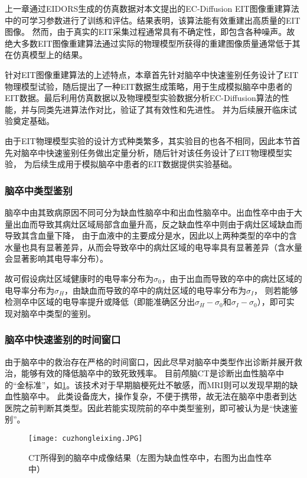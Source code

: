 

上一章通过EIDORS生成的仿真数据对本文提出的EC-Diffusion EIT图像重建算法中的可学习参数进行了训练和评估。结果表明，该算法能有效重建出高质量的EIT图像。
然而，由于真实的EIT采集过程通常具有不确定性，即包含各种噪声。故绝大多数EIT图像重建算法通过实际的物理模型所获得的重建图像质量通常低于其在仿真模型上的结果。

针对EIT图像重建算法的上述特点，本章首先针对脑卒中快速鉴别任务设计了EIT物理模型试验，随后提出了一种EIT数据生成策略，用于生成模拟脑卒中患者的EIT数据。最后利用仿真数据以及物理模型实验数据分析EC-Diffusion算法的性能，并与同类先进算法作对比，验证了其有效性和先进性。
并为后续展开临床试验奠定基础。

由于EIT物理模型实验的设计方式种类繁多，其实验目的也各不相同，因此本节首先对脑卒中快速鉴别任务做出定量分析，随后针对该任务设计了EIT物理模型实验，
为后续生成用于模拟脑卒中患者的EIT数据提供实验基础。


\subsubsection{脑卒中类型鉴别}
脑卒中由其致病原因不同可分为缺血性脑卒中和出血性脑卒中。出血性卒中由于大量出血而导致其病灶区域局部含血量升高，反之缺血性卒中则由于病灶区域缺血而导致其含血量下降，
由于血液中的主要成分是水，因此以上两种类型的卒中的含水量也具有显著差异，从而会导致卒中的病灶区域的电导率具有显著差异（含水量会显著影响其电导率分布）。

故可假设病灶区域健康时的电导率分布为$\sigma_0$，由于出血而导致的卒中的病灶区域的电导率分布为$\sigma_H$，由缺血而导致的卒中的病灶区域的电导率分布为$\sigma_I$，
则若能够检测卒中区域的电导率提升或降低（即能准确区分出$\sigma_H - \sigma_0$和$\sigma_I - \sigma_0$），即可实现对脑卒中类型的鉴别。

\subsubsection{脑卒中快速鉴别的时间窗口}
由于脑卒中的救治存在严格的时间窗口，因此尽早对脑卒中类型作出诊断并展开救治，能够有效的降低脑卒中的致死致残率。
目前颅脑CT是诊断出血性脑卒中的“金标准”，如\cref{figure:cuzhongleixing}。该技术对于早期脑梗死灶不敏感，而MRI则可以发现早期的缺血性脑卒中。
此类设备庞大，操作复杂，不便于携带，故无法在脑卒中患者到达医院之前判断其类型。因此若能实现院前的卒中类型鉴别，即可被认为是“快速鉴别”。
\begin{figure}[h]
    \centering
    \texttt{[image: cuzhongleixing.JPG]}
    \caption{CT所得到的脑卒中成像结果（左图为缺血性卒中，右图为出血性卒中）\cite{5335289}}
    \label{figure:cuzhongleixing}
\end{figure}


